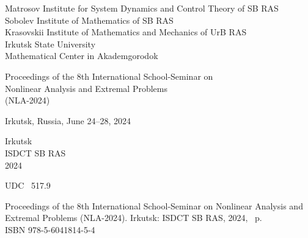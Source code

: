 \documentclass[12pt,final]{llncs}
\begin{document}
%
%
\frontmatter          %
\setcounter{page}{1}
%
%

\begin{center}
{\bf
  \thispagestyle{empty}
  \pagestyle{fancy}

   	Matrosov Institute for System Dynamics and Control Theory of  SB RAS\\[0.3em]

 	Sobolev Institute of Mathematics  of SB RAS\\[0.3em]

  Krasovskii Institute of Mathematics and Mechanics of UrB RAS\\[0.3em]

 	Irkutsk State University\\[0.3em]
 	Mathematical Center in Akademgorodok
 	  }


\vfill

{  \Large Proceedings of the 8th International School-Seminar on\\[0.3em]

Nonlinear Analysis and Extremal Problems\\[0.3em]

  (NLA-2024)\\[0.2em] }

{\Large  Irkutsk, Russia, June 24--28, 2024 }

\vfill
\vfill



Irkutsk\\
ISDCT SB RAS\\
2024

\end{center}

\newpage

\thispagestyle{empty}
\noindent{}UDC \ 517.9

 \vspace{3cm}

Proceedings of the 8th International School-Seminar on Nonlinear
Analysis and Extremal Problems  (NLA-2024). Irkutsk\;:
ISDCT SB RAS, 2024, \pageref{LastPage}~p.\\
ISBN 978-5-6041814-5-4

 \vspace{1cm}
\end{document}
